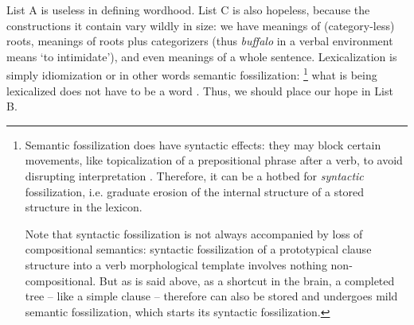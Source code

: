 \documentclass[a4paper, oneside, scheme=plain, 12pt]{article}
\newcommand{\form}[1]{\emph{#1}}
\newcommand{\translate}[1]{`#1'}
\begin{document}
List A is useless in defining wordhood.
List C is also hopeless, because the constructions it contain vary wildly in size:
we have meanings of (category-less) roots,
meanings of roots plus categorizers (thus \form{buffalo} in a verbal environment means \translate{to intimidate}),
and even meanings of a whole sentence.
Lexicalization is simply idiomization or in other words semantic fossilization:%
\footnote{
    Semantic fossilization does have syntactic effects:
    they may block certain movements, like topicalization of a prepositional phrase 
    after a verb, to avoid disrupting interpretation \citep{nediger2017unifying}.
    Therefore, it can be a hotbed for \emph{syntactic} fossilization,
    i.e. graduate erosion of the internal structure of a stored structure in the lexicon.

    Note that syntactic fossilization is not always accompanied by loss of compositional semantics:
    syntactic fossilization of a prototypical clause structure 
    into a verb morphological template involves nothing non-compositional.
    But as is said above, as a shortcut in the brain,
    a completed tree -- like a simple clause -- therefore can also be stored
    and undergoes mild semantic fossilization,
    which starts its syntactic fossilization.
}
what is being lexicalized does not have to be a word \citep{harley1999distributed}.
Thus, we should place our hope in List B. 
\end{document}
